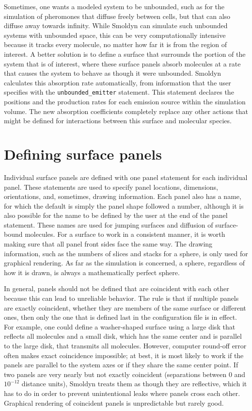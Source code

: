 \documentclass {scrbook}
\newcommand {\ttt} {\texttt}
\begin{document}
Sometimes, one wants a modeled system to be unbounded, such as for the simulation of pheromones that diffuse freely between cells, but that can also diffuse away towards infinity. While Smoldyn can simulate such unbounded systems with unbounded space, this can be very computationally intensive because it tracks every molecule, no matter how far it is from the region of interest. A better solution is to define a surface that surrounds the portion of the system that is of interest, where these surface panels absorb molecules at a rate that causes the system to behave as though it were unbounded. Smoldyn calculates this absorption rate automatically, from information that the user specifies with the \ttt{unbounded\_emitter} statement. This statement declares the positions and the production rates for each emission source within the simulation volume. The new absorption coefficients completely replace any other actions that might be defined for interactions between this surface and molecular species.

\section{Defining surface panels}

Individual surface panels are defined with one panel statement for each individual panel. These statements are used to specify panel locations, dimensions, orientations, and, sometimes, drawing information. Each panel also has a name, for which the default is simply the panel shape followed a number, although it is also possible for the name to be defined by the user at the end of the panel statement. These names are used for jumping surfaces and diffusion of surface-bound molecules. For a surface to work in a consistent manner, it is worth making sure that all panel front sides face the same way. The drawing information, such as the numbers of slices and stacks for a sphere, is only used for graphical rendering. As far as the simulation is concerned, a sphere, regardless of how it is drawn, is always a mathematically perfect sphere.

In general, panels should not be defined that are coincident with each other because this can lead to unreliable behavior. The rule is that if multiple panels are exactly coincident, whether they are members of the same surface or different ones, then only the one that is defined last in the configuration file is in effect. For example, one could define a washer-shaped surface using a large disk that reflects all molecules and a small disk, which has the same center and is parallel to the large disk, that transmits all molecules. However, computer round-off error often makes exact coincidence impossible; at best, it is most likely to work if the panels are parallel to the system axes or if they share the same center point. If two panels are very nearly but not exactly coincident (separations between 0 and $10^{-12}$ distance units), Smoldyn treats them as though they are reflective, which it has to do in order to prevent unintentional leaks where panels cross each other. Graphical rendering of coincident panels is unpredictable but rarely good.
\end{document}
